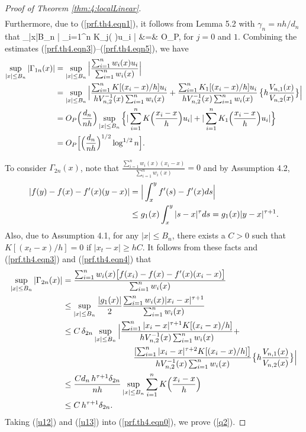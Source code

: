 \begin{proof}[Proof of Theorem \ref {thm:4:localLinear}]
\begin{align}
\end{align}
Furthermore, due to (\ref{prf.th4.eqn1}), it follows from Lemma 5.2 with $\gamma_n=nh/ d_n$ that
\be
\sup_{|x|\le B_n} \Big | \sum_{i=1}^n K_j\Big ( \Big )u_i \Big | &=& O_P,
\ee
for $j = 0$ and $1$.
Combining the estimates (\ref{prf.th4.eqn3})--(\ref{prf.th4.eqn5}), we have
\begin{align}
 \sup_{|x| \le B_n} | \Gamma_{1n}(x) |  &=  \sup_{|x| \le B_n} \Big |\frac{\sum_{i = 1}^n w_i(x) u_i }{\sum_{i = 1}^n w_i(x)}  \Big | \no\\
 &= \sup_{|x| \le B_n} \Big | \frac{ \sum_{i = 1}^n K [(x_i - x)/h] u_i  }{  hV_{n,2}^{-1}(x) \sum_{i = 1}^n w_i(x)} + \frac{ \sum_{i = 1}^n  K_1[ (x_i - x)/h] u_i}{  hV_{n,2}^{-1}(x) \sum_{i = 1}^n w_i(x) }\,\big \{h\frac{ V_{n, 1}(x)}{V_{n,2}(x)}\big \}\Big | \no\\
 &= O_P \Big ( \frac{d_n}{n h} \Big ) \sup_{|x| \le B_n} \Big \{|\sum_{i = 1}^n K \Big (\frac{x_i - x}{h}\Big ) u_i| + | \sum_{i = 1}^n  K_1\Big (\frac{x_i - x}{h}\Big) u_i   | \Big \} \no\\
 &= O_P \Big [ \Big (\frac{d_n}{nh} \Big )^{1/2} \log^{1/2} n \Big ]. \la {u12}
 \end{align}

To consider  $\Gamma_{2n}(x)$, note that $\frac{\sum_{i = 1}^n w_i(x)  ( x_i-  x) }{\sum_{i = 1}^n w_i(x)}   = 0$ and by Assumption 4.2,
\begin{align}
|f(y) - f(x) - f'(x)(y - x)| &= \Big | \int_x^y f'(s) - f'(x) ds\Big | \nonumber\\
&\le  g_1(x)\int_{x}^y |s - x|^{\tau} ds = g_1(x)|y - x|^{\tau + 1}. \nonumber
\end{align}
Also, due to Assumption 4.1, for any $|x| \le B_n$, there exists a $C>0$ such that $K[(x_t-x)/h]=0$ if $|x_t-x|\ge hC$. It follows from these facts and (\ref {prf.th4.eqn3}) and
(\ref {prf.th4.eqn4}) that
\begin{align}
\sup_{|x| \le B_n} | \Gamma_{2n}(x) | &= \frac{\sum_{i = 1}^n w_i(x) \big [ f(x_i) - f(x) - f'(x) (x_i - x) \big ] }{\sum_{i = 1}^n w_i(x)}  \no\\
&\le \sup_{|x| \le B_n} \frac{| g_1(x)|}{2} \frac{\sum_{i = 1}^n w_i(x)  | x_i-  x|^{\tau + 1} }{\sum_{i = 1}^n w_i(x)}  \no\\
&\le C\, \de_{2n}  \sup_{|x| \le B_n} \Big |\frac{ \sum_{i = 1}^n | x_i-  x|^{\tau + 1}K[ (x_i - x)/h]   }{ h V^{-1}_{n, 2}(x) \sum_{i = 1}^n w_i(x)}  +  \no\\
&\hskip 3cm \frac{ [\sum_{i = 1}^n | x_i-  x|^{\tau + 2}K [(x_i - x)/h]  \big ]}{ h V^{-1}_{n, 2}(x) \sum_{i = 1}^n w_i(x) } \big \{h\frac{ V_{n, 1}(x)}{V_{n,2}(x)}\big \}  \Big |\no\\
&\le  \frac{Cd_n\, h^{\tau + 1}\de_{2n} }{n h}  \sup_{|x| \le B_n} \sum_{i = 1}^n K \Big (\frac{x_i - x}{h} \Big )    \no\\
&\le C\,h^{\tau + 1} \de_{2n}.\la {u13}
\end{align} 
Taking (\ref {u12}) and (\ref {u13}) into (\ref {prf.th4.eqn0}), we prove (\ref {q2}).
\end{proof}




